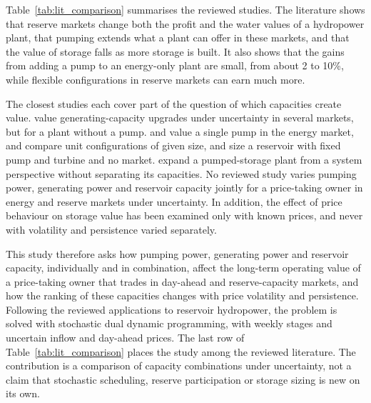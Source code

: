 Table~\ref{tab:lit_comparison} summarises the reviewed studies. The
literature shows that reserve markets change both the profit and the
water values of a hydropower plant, that pumping extends what a plant
can offer in these markets, and that the value of storage falls as more
storage is built. It also shows that the gains from adding a pump to an
energy-only plant are small, from about 2 to 10\%, while flexible
configurations in reserve markets can earn much more.

The closest studies each cover part of the question of which capacities
create value. \citet{bore2026assessing} value generating-capacity
upgrades under uncertainty in several markets, but for a plant without a
pump. \citet{alic2023optimal} and \citet{schuller2024practical} value a
single pump in the energy market, \citet{helseth2017iet} and
\citet{chazarra2017} compare unit configurations of given size, and
\citet{zisos2023mixing} size a reservoir with fixed pump and turbine and
no market. \citet{helseth2017} expand a pumped-storage plant from a
system perspective without separating its capacities. No reviewed study
varies pumping power, generating power and reservoir capacity jointly
for a price-taking owner in energy and reserve markets under uncertainty.
In addition, the effect of price behaviour on storage value has been
examined only with known prices, and never with volatility and
persistence varied separately.

This study therefore asks how pumping power, generating power and
reservoir capacity, individually and in combination, affect the
long-term operating value of a price-taking owner that trades in
day-ahead and reserve-capacity markets, and how the ranking of these
capacities changes with price volatility and persistence. Following the
reviewed applications to reservoir hydropower, the problem is solved
with stochastic dual dynamic programming, with weekly stages and
uncertain inflow and day-ahead prices. The last row of
Table~\ref{tab:lit_comparison} places the study among the reviewed
literature. The contribution is a comparison of capacity combinations
under uncertainty, not a claim that stochastic scheduling, reserve
participation or storage sizing is new on its own.

